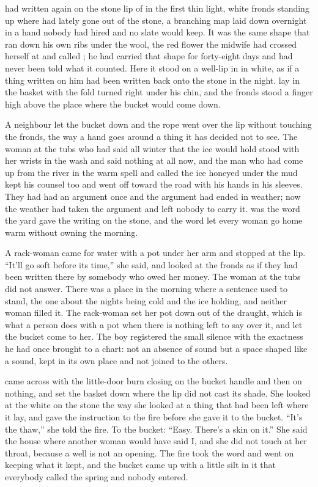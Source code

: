 
 had written again on the stone lip of  in the first thin light, white fronds standing up where  had lately gone out of the stone, a branching map laid down overnight in a hand nobody had hired and no slate would keep. It was the same shape that ran down his own ribs under the wool, the red flower the midwife had crossed herself at and called ; he had carried that shape for forty-eight days and had never been told what it counted. Here it stood on a well-lip in  in white, as if a thing written on him had been written back onto the stone in the night.  lay in the basket with the fold turned right under his chin, and the fronds stood a finger high above the place where the bucket would come down.

A neighbour let the bucket down and the rope went over the lip without touching the fronds, the way a hand goes around a thing it has decided not to see. The woman at the tubs who had said all winter that the ice would hold stood with her wrists in the wash and said nothing at all now, and the man who had come up from the river in the warm spell and called the ice honeyed under the mud kept his counsel too and went off toward the road with his hands in his sleeves. They had had an argument once and the argument had ended in weather; now the weather had taken the argument and left nobody to carry it.  was the word the yard gave the writing on the stone, and the word let every woman go home warm without owning the morning.

A rack-woman came for water with a pot under her arm and stopped at the lip. “It'll go soft before its time,” she said, and looked at the fronds as if they had been written there by somebody who owed her money. The woman at the tubs did not answer. There was a place in the morning where a sentence used to stand, the one about the nights being cold and the ice holding, and neither woman filled it. The rack-woman set her pot down out of the draught, which is what a person does with a pot when there is nothing left to say over it, and let the bucket come to her. The boy registered the small silence with the exactness he had once brought to a chart: not an absence of sound but a space shaped like a sound, kept in its own place and not joined to the others.

 came across with the little-door burn closing on the bucket handle and then on nothing, and set the basket down where the lip did not cast its shade. She looked at the white on the stone the way she looked at a thing that had been left where it lay, and gave the instruction to the fire before she gave it to the bucket. “It's the thaw,” she told the fire. To the bucket: “Easy. There's a skin on it.” She said the house where another woman would have said I, and she did not touch  at her throat, because a well is not an opening. The fire took the word and went on keeping what it kept, and the bucket came up with a little silt in it that everybody called the spring and nobody entered.

